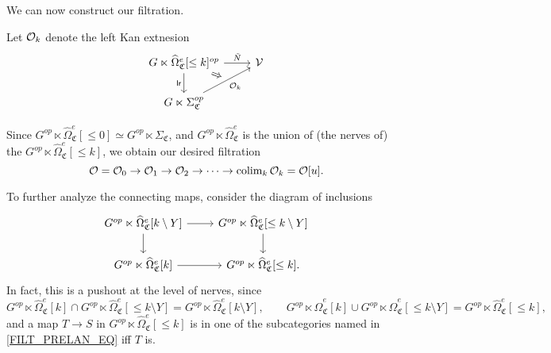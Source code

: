 \documentclass[a4paper,10pt
,draft
]{article}%
\renewcommand{\hat}{\widehat}
\renewcommand{\1}{\eta}%
\newcommand{\SC}{\Sigma_{\mathfrak C}}
\begin{document}
We can now construct our filtration.
\begin{definition}
      Let $\mathcal{O}_k$ denote the left Kan extnesion
      \begin{equation}
            \begin{tikzcd}
                  |[alias = A]| G \ltimes \hat\Omega_{\mathfrak C}^e[\leq k]^{op} \arrow[r, "\tilde N"] \arrow[d, "\mathsf{lr}"']
                  &
                  \V
                  \\
                  G \ltimes \SC^{op} \arrow[ur, "\O_k"', ""{name = B}]
                  \arrow[Rightarrow, from = A, to = B]
            \end{tikzcd}
      \end{equation}
\end{definition}

Since $G^{op} \ltimes \hat\Omega_{\mathfrak C}^e[\leq 0] \simeq G^{op} \ltimes \SC$, and
$G^{op} \ltimes \hat\Omega_{\mathfrak C}^e$ is the union of (the nerves of) the $G^{op} \ltimes \hat\Omega_{\mathfrak C}^e[\leq k]$,
we obtain our desired filtration
\begin{equation}
      \mathcal{O} = \mathcal{O}_0 \to \mathcal{O}_1 \to \mathcal{O}_2 \to \dots \to \operatorname{colim}_k\mathcal{O}_k = \mathcal{O}[u].
\end{equation}

To further analyze the connecting maps, consider the diagram of inclusions
\begin{equation}
      \label{FILT_PRELAN_EQ}
      \begin{tikzcd}
            G^{op} \ltimes \hat\Omega_{\mathfrak C}^e[k \setminus Y] \arrow[r] \arrow[d]
            &
            G^{op} \ltimes \hat\Omega_{\mathfrak C}^e[\leq k \setminus Y] \arrow[d]
            \\
            G^{op} \ltimes \hat\Omega_{\mathfrak C}^e[k] \arrow[r]
            &
            G^{op} \ltimes \hat\Omega_{\mathfrak C}^e[\leq k].
      \end{tikzcd}
\end{equation}
In fact, this is a pushout at the level of nerves, since
\begin{equation}
      G^{op} \ltimes \hat\Omega_{\mathfrak C}^e[k]
      \cap
      G^{op} \ltimes \hat\Omega_{\mathfrak C}^e[\leq k \setminus Y]
      =
      G^{op} \ltimes \hat\Omega_{\mathfrak C}^e[k \setminus Y],
      \qquad
      G^{op} \ltimes \hat\Omega_{\mathfrak C}^e[k]
      \cup
      G^{op} \ltimes \hat\Omega_{\mathfrak C}^e[\leq k \setminus Y]
      =
      G^{op} \ltimes \hat\Omega_{\mathfrak C}^e[\leq k],
\end{equation}
and a map $T \to S$ in $G^{op} \ltimes \hat\Omega_{\mathfrak C}^e[\leq k]$ is in one of the subcategories named in \eqref{FILT_PRELAN_EQ} iff $T$ is.
\end{document}
